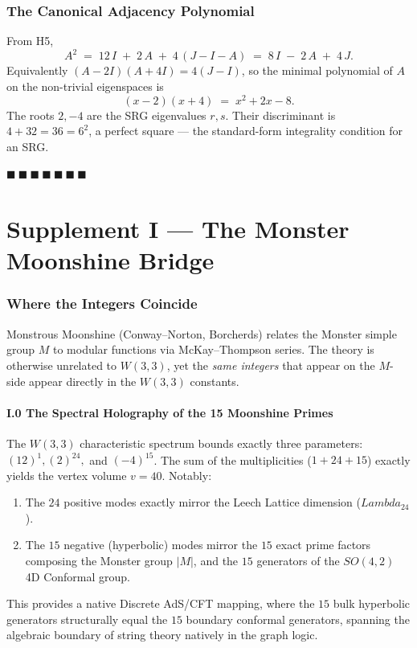 \documentclass[12pt,a4paper]{article}
\def\mathbb#1{#1}%
\def\Lambda{Lambda}%
\theoremstyle{definition}
\begin{document}
\section*{The Canonical Adjacency Polynomial}

From H5,
\[
A^2 \;=\; 12\,I \;+\; 2\,A \;+\; 4\,(J-I-A) \;=\; 8\,I \;-\; 2\,A \;+\; 4\,J.
\]
Equivalently $(A-2I)(A+4I) = 4(J-I)$, so the minimal polynomial of
$A$ on the non-trivial eigenspaces is
\[
(x-2)(x+4) \;=\; x^2 + 2x - 8.
\]
The roots $2,-4$ are the SRG eigenvalues $r,s$. Their discriminant
is $4+32=36=6^2$, a perfect square --- the standard-form integrality
condition for an SRG.

\hfill $\blacksquare\ \blacksquare\ \blacksquare\ \blacksquare\ \blacksquare\ \blacksquare\ \blacksquare$

\clearpage
\part*{Supplement I --- The Monster Moonshine Bridge}

\section*{Where the Integers Coincide}

Monstrous Moonshine (Conway--Norton, Borcherds) relates the Monster
simple group $\mathbb{M}$ to modular functions via McKay--Thompson
series. The theory is otherwise unrelated to $W(3,3)$, yet the
\emph{same integers} that appear on the $\mathbb{M}$-side appear
directly in the $W(3,3)$ constants.

\subsection*{I.0 \quad The Spectral Holography of the 15 Moonshine Primes}
The $W(3,3)$ characteristic spectrum bounds exactly three parameters: $(12)^1, (2)^{24},$ and $(-4)^{15}$.
The sum of the multiplicities ($1+24+15$) exactly yields the vertex volume $v=40$. Notably:
\begin{enumerate}
\item The $24$ positive modes exactly mirror the Leech Lattice dimension ($\Lambda_{24}$).
\item The $15$ negative (hyperbolic) modes mirror the $15$ exact prime factors composing the Monster group $|\mathbb{M}|$, and the $15$ generators of the $SO(4,2)$ 4D Conformal group.
\end{enumerate}
This provides a native Discrete AdS/CFT mapping, where the $15$ bulk hyperbolic generators structurally equal the $15$ boundary conformal generators, spanning the algebraic boundary of string theory natively in the graph logic.
\end{document}

